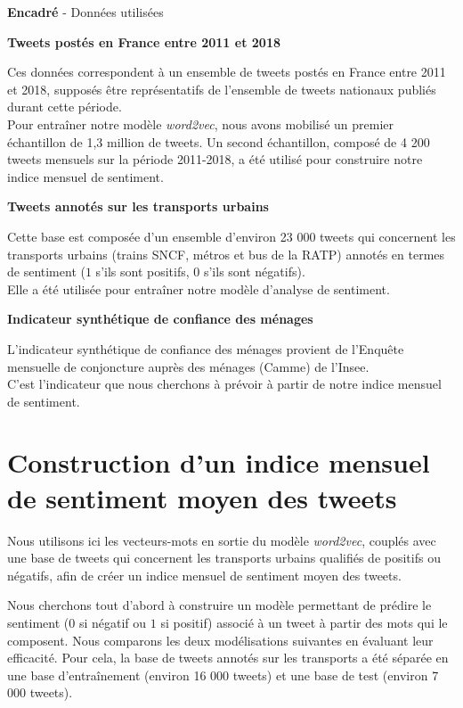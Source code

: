 \documentclass[10pt,french,french]{article}
\newcounter{comptEncadre}
\renewcommand\thecomptEncadre{%
\arabic{comptEncadre}}
\newenvironment{encadre}[2][false]{\refstepcounter{comptEncadre}
\begin{bclogo}[couleur=processblue!5,arrondi=0.1,
logo=\bcloupe,barre=none,couleurBord=blue!60!green,nobreak = #1]{ {\sc \textbf{Encadré \thecomptEncadre}} -  #2}
\smallskip
}{\end{bclogo}}
\begin{document}
\begin{encadre}[true]{Données utilisées}\label{enc:encadre1}

\small

\textbf{Tweets postés en France entre 2011 et 2018}

Ces données correspondent à un ensemble de tweets postés en France entre 2011 et 2018, supposés être représentatifs de l'ensemble de tweets nationaux publiés durant cette période. \\
Pour entraîner notre modèle \emph{word2vec}, nous avons mobilisé un premier échantillon de 1,3 million de tweets. Un second échantillon, composé de 4 200 tweets mensuels sur la période 2011-2018, a été utilisé pour construire notre indice mensuel de sentiment. 

\textbf{Tweets annotés sur les transports urbains}

Cette base est composée d'un ensemble d'environ 23 000 tweets qui concernent les transports urbains (trains SNCF, métros et bus de la RATP) annotés en termes de sentiment ($1$ s'ils sont positifs, $0$ s'ils sont négatifs).\\
Elle a été utilisée pour entraîner notre modèle d'analyse de sentiment.

\textbf{Indicateur synthétique de confiance des ménages}

L’indicateur synthétique de confiance des ménages provient de l'Enquête mensuelle de conjoncture auprès des ménages (Camme) de l’Insee.\\
C'est l'indicateur que nous cherchons à prévoir à partir de notre indice mensuel de sentiment.

\end{encadre}

\newpage

\hypertarget{sec:sentimentalAnalysis}{%
\section{Construction d'un indice mensuel de sentiment moyen des tweets}\label{sec:sentimentalAnalysis}}

Nous utilisons ici les vecteurs-mots en sortie du modèle \emph{word2vec}, couplés avec une base de tweets qui concernent les transports urbains qualifiés de positifs ou négatifs, afin de créer un indice mensuel de sentiment moyen des tweets.

Nous cherchons tout d'abord à construire un modèle permettant de prédire le sentiment (\(0\) si négatif ou \(1\) si positif) associé à un tweet à partir des mots qui le composent. Nous comparons les deux modélisations suivantes en évaluant leur efficacité. Pour cela, la base de tweets annotés sur les transports a été séparée en une base d'entraînement (environ 16 000 tweets) et une base de test (environ 7 000 tweets).
\end{document}

